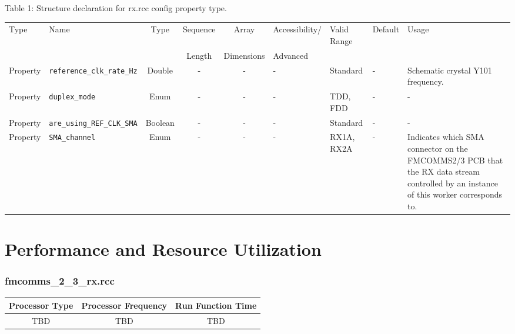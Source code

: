 \documentclass{article}
\def\comp{rx}
\begin{document}
\begin{landscape}
	Table \hypertarget{tab1}{1}: Structure declaration for \comp{}.rcc config property type.
	\begin{scriptsize}
		\begin{longtable}{|p{1.8cm}|p{3.6cm}|c|c|c|p{2cm}|p{3.7cm}|p{3.7cm}|p{2.5cm}|}
			\hline
			\rowcolor{blue}
			Type         & Name                                & Type & Sequence & Array      & Accessibility/ & Valid Range  & Default & Usage                                                                                                                                                                                                                       \\
			\rowcolor{blue}
			             &                                     &      & Length   & Dimensions & Advanced       &              &         &                                                                                                                                                                                                                             \\
			\hline
			Property     & \verb+reference_clk_rate_Hz+                   & Double & -        & -          & - & Standard & - & Schematic crystal Y101 frequency. \\
			\hline
			Property     & \verb+duplex_mode+                             & Enum   & -        & -          & - & TDD, FDD & - & - \\
			\hline
			Property     & \verb+are_using_REF_CLK_SMA+                             & Boolean& -        & -          & - & Standard & - & - \\
			\hline
			Property     & \verb+SMA_channel+                                       & Enum   & -        & -          & - & RX1A, RX2A & - & Indicates which SMA connector on the FMCOMMS2/3 PCB that the RX data stream controlled by an instance of this worker corresponds to. \\
			\hline
		\end{longtable}
	\end{scriptsize}

\end{landscape}

\section*{Performance and Resource Utilization}
\subsubsection*{fmcomms\_2\_3\_rx.rcc}
\begin{scriptsize}
	\begin{tabular}{|c|c|c|}
		\hline
		\rowcolor{blue}
		Processor Type & Processor Frequency & Run Function Time \\
		\hline
		TBD            & TBD                 & TBD               \\
		\hline
	\end{tabular}
\end{scriptsize}
\end{document}
